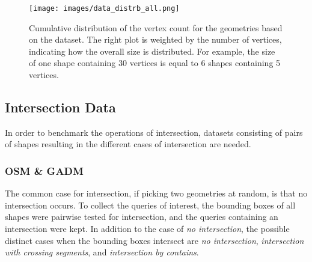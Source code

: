 \begin{table}[H]
\centering
\caption{Characteristics of datasets.} 
\label{tab:dataset_stats}
\end{table}

\begin{figure}[htbp]
    \centering
    \texttt{[image: images/data\_distrb\_all.png]}
    \caption{Cumulative distribution of the vertex count for the geometries based on the dataset. The right plot is weighted by the number of vertices, indicating how the overall size is distributed. For example, the size of one shape containing 30 vertices is equal to 6 shapes containing 5 vertices.}
        \label{img:data_distrb_all}
\end{figure}






\subsection{Intersection Data}
\label{sec:intersectiondataintro}
In order to benchmark the operations of intersection, datasets consisting of pairs of shapes resulting in the different cases of intersection are needed.

\subsubsection{OSM \& GADM}
The common case for intersection, if picking two geometries at random, is that no intersection occurs. To collect the queries of interest, the bounding boxes of all shapes were pairwise tested for intersection, and the queries containing an intersection were kept. In addition to the case of \emph{no intersection}, the possible distinct cases when the bounding boxes intersect are \emph{no intersection}, \emph{intersection with crossing segments}, and \emph{intersection by contains}.

